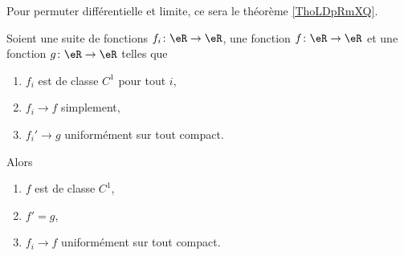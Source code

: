 Pour permuter différentielle et limite, ce sera le théorème \ref{ThoLDpRmXQ}.
\begin{theorem}     \label{THOooXZQCooSRteSr}
    Soient une suite de fonctions \( f_i\colon \eR\to \eR\), une fonction \( f\colon \eR\to \eR\) et une fonction \( g\colon \eR\to \eR\) telles que
    \begin{enumerate}
        \item
            \( f_i\) est de classe \( C^1\) pour tout \( i\),
        \item
            \( f_i\to f\) simplement,
        \item
            \( f_i'\to g\) uniformément sur tout compact.
    \end{enumerate}
    Alors
    \begin{enumerate}
        \item
            \( f\) est de classe \( C^1\),
        \item
            \( f'=g\),
        \item
            \( f_i\to f\) uniformément sur tout compact.
    \end{enumerate}
\end{theorem}

